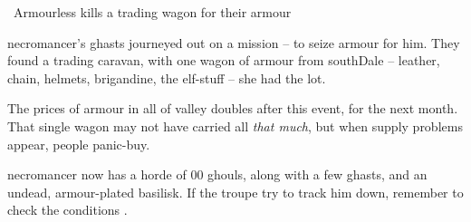\boxPair[t]{
  \thenecromancer
}{
  \showStdSpells
}

\newcommand\deadProgressChart{
  \begin{nametable}{Dead Tactics}

    \textbf{Round} & \textbf{Event} \\\hline

    1 & 200 ghouls assault the gate. \\

    2 & 4 ghasts each attack a quarter of the \gls{village} each (one attempts to open the gate). \\

    3 & \Gls{necromancer} casts offensive spells on anyone at the gate. \\

    4 & The ghouls have formed a pyramid at the gate. \\

    5 & 5 ghouls climb over the gate. \\

    6 & 10 more ghouls climb over the gate. \\

    7 & 15 more ghouls climb over the gate. \\

    8 & Resolve the roll. \\

  \end{nametable}
  \label{necroTactics}
}

{\squash~Armourless}%
{ kills a trading wagon for their armour}%
\label{necroArmour}

\begin{exampletext}
  \Gls{necromancer}'s ghasts journeyed out on a mission -- to seize armour for him.
  They found a trading caravan, with one wagon of armour from \gls{southDale} -- leather, chain, helmets, brigandine, the elf-stuff -- she had the lot.
\end{exampletext}

The prices of armour in all of \gls{valley} doubles after this event, for the next month.
That single wagon may not have carried all \emph{that much}, but when supply problems appear, people panic-buy.

\Gls{necromancer} now has a horde of 00 ghouls, along with a few ghasts, and an undead, armour-plated \gls{basilisk}.
If the troupe try to track him down, remember to check the conditions .

